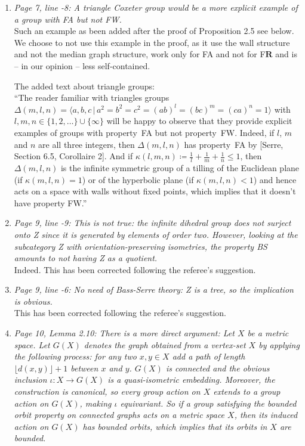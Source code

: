 \documentclass[english,a4paper]{article}
\newcommand*{\FB}{FB\textsubscript{r}}
\newcommand*{\FW}{FW}
\newcommand*{\FA}{FA}
\newcommand*{\FR}{F\textbf{R}}
\begin{document}
\begin{enumerate}
Also added as a discussion after the proof:\\
``In view of Proposition~2.5, two questions remain open: is the implication $[\textnormal{Bergman's property}\implies\textnormal{\FB}]$ strict, and does property~\FW{} implies property~\FR?''
%
\item\textit{Page 7, line -8: A triangle Coxeter group would be a more explicit example of a group with FA but not FW.}\\
Such an example as been added after the proof of Proposition 2.5 see below. We choose to not use this example in the proof, as it use the wall structure and not the median graph structure, work only for FA and not for F$\mathbf{R}$ and is -- in our opinion -- less self-contained.

The added text about triangle groups:\\
``The reader familiar with triangles groups $\Delta(m,l,n)=\langle a,b,c\,|\,a^2=b^2=c^2=(ab)^l=(bc)^m=(ca)^n=1\rangle$ with $l,m,n\in\{1,2,\dots\}\cup\{\infty\}$ will be happy to observe that they provide explicit examples of groups with property~\FA{} but not property~\FW.
Indeed, if $l$, $m$ and $n$ are all three integers, then $\Delta(m,l,n)$ has property~\FA{} by [Serre, Section 6.5, Corollaire 2].
And if $\kappa(l,m,n)\coloneqq\frac1l+\frac1m+\frac1n\leq 1$, then $\Delta(m,l,n)$ is the infinite symmetric group of a tilling of the Euclidean plane (if $\kappa(m,l,n)=1$) or of the hyperbolic plane (if $\kappa(m,l,n)<1$) and hence acts on a space with walls without fixed points, which implies that it doesn't have property FW.''
%
\setcounter{enumi}{11}
\item\textit{Page 9, line -9: This is not true: the infinite dihedral group does not surject onto Z since it is generated by elements of order two. However, looking at the subcategory {Z} with orientation-preserving isometries, the property BS amounts to not having Z as a quotient.}\\
Indeed. This has been corrected following the referee's suggestion.
%
\item\textit{Page 9, line -6: No need of Bass-Serre theory: Z is a tree, so the implication is obvious.}\\
This has been corrected following the referee's suggestion.
%
\item\textit{Page 10, Lemma 2.10: There is a more direct argument: Let $X$ be a metric space. Let $G(X)$ denotes the graph obtained from a vertex-set $X$ by applying the following process: for any two $x, y\in X$ add a path of length $\lfloor d(x, y)\rfloor + 1$ between $x$ and $y$. $G(X)$ is connected and the obvious inclusion $\iota\colon X\to G(X)$ is a quasi-isometric embedding. Moreover, the construction is canonical, so every group action on $X$ extends to a group action on $G(X)$, making $\iota$ equivariant. So if a group satisfying the bounded orbit property on connected graphs acts on a metric space $X$, then its induced action on $G(X)$ has bounded orbits, which implies that its orbits in $X$ are bounded.}\\

\end{enumerate}
\end{document}
